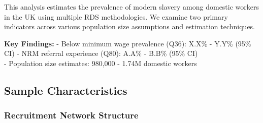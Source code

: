 \documentclass[
  12pt,
  letterpaper,
  DIV=11,
  numbers=noendperiod]{scrartcl}
\theoremstyle{plain}
\theoremstyle{definition}
\begin{document}
This analysis estimates the prevalence of modern slavery among domestic
workers in the UK using multiple RDS methodologies. We examine two
primary indicators across various population size assumptions and
estimation techniques.

\textbf{Key Findings:} - Below minimum wage prevalence (Q36): X.X\% -
Y.Y\% (95\% CI) - NRM referral experience (Q80): A.A\% - B.B\% (95\%
CI)\\
- Population size estimates: 980,000 - 1.74M domestic workers

\subsection{Sample Characteristics}\label{sample-characteristics}

\subsubsection{Recruitment Network
Structure}\label{recruitment-network-structure}
\end{document}
